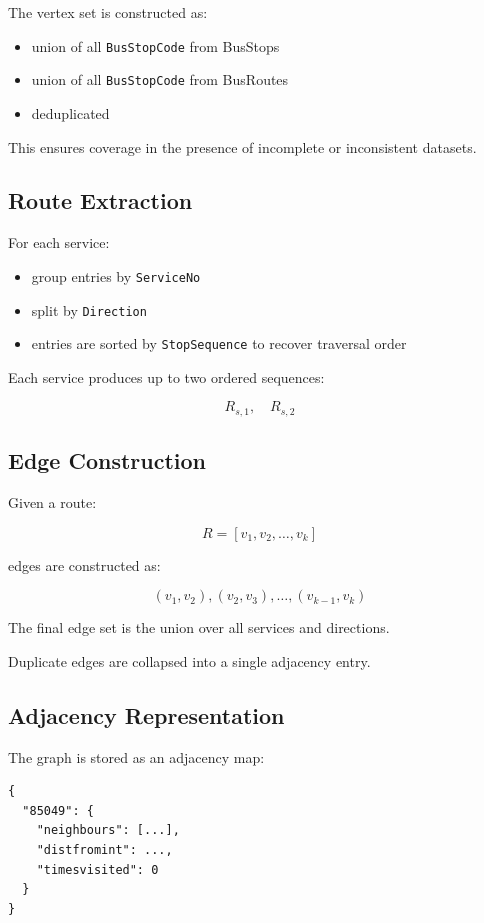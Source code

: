 \documentclass[11pt,a4paper]{article}
\begin{document}
The vertex set is constructed as:

\begin{itemize}
    \item union of all \texttt{BusStopCode} from BusStops
    \item union of all \texttt{BusStopCode} from BusRoutes
    \item deduplicated
\end{itemize}

This ensures coverage in the presence of incomplete or inconsistent datasets.

\subsection{Route Extraction}

For each service:

\begin{itemize}
    \item group entries by \texttt{ServiceNo}
    \item split by \texttt{Direction}
    \item entries are sorted by \texttt{StopSequence} to recover traversal order
\end{itemize}

Each service produces up to two ordered sequences:

\[
R_{s,1}, \quad R_{s,2}
\]

\subsection{Edge Construction}

Given a route:

\[
R = [v_1, v_2, \dots, v_k]
\]

edges are constructed as:

\[
(v_1,v_2), (v_2,v_3), \dots, (v_{k-1},v_k)
\]

The final edge set is the union over all services and directions.

Duplicate edges are collapsed into a single adjacency entry.

\subsection{Adjacency Representation}

The graph is stored as an adjacency map:

\begin{verbatim}
{
  "85049": {
    "neighbours": [...],
    "distfromint": ...,
    "timesvisited": 0
  }
}
\end{verbatim}
\end{document}
